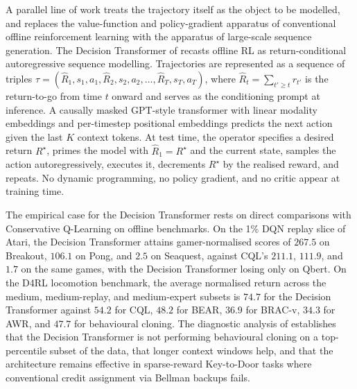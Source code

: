 A parallel line of work treats the trajectory itself as the object to be modelled,
and replaces the value-function and policy-gradient apparatus of conventional
offline reinforcement learning with the apparatus of large-scale sequence
generation. The Decision Transformer of \citet{Chen2021DT} recasts offline RL as
return-conditional autoregressive sequence modelling. Trajectories are represented
as a sequence of triples
$\tau = (\hat R_1, s_1, a_1, \hat R_2, s_2, a_2, \dots, \hat R_T, s_T, a_T)$, where
$\hat R_t = \sum_{t' \ge t} r_{t'}$ is the return-to-go from time $t$ onward and
serves as the conditioning prompt at inference. A causally masked GPT-style
transformer with linear modality embeddings and per-timestep positional
embeddings predicts the next action given the last $K$ context tokens. At test
time, the operator specifies a desired return $R^\star$, primes the model with
$\hat R_1 = R^\star$ and the current state, samples the action autoregressively,
executes it, decrements $R^\star$ by the realised reward, and repeats. No
dynamic programming, no policy gradient, and no critic appear at training time.

The empirical case for the Decision Transformer rests on direct comparisons with
Conservative Q-Learning \citep{Kumar2020} on offline benchmarks. On the 1\% DQN
replay slice of Atari, the Decision Transformer attains gamer-normalised scores of
$267.5$ on Breakout, $106.1$ on Pong, and $2.5$ on Seaquest, against CQL's
$211.1$, $111.9$, and $1.7$ on the same games, with the Decision Transformer
losing only on Qbert. On the D4RL locomotion benchmark, the average normalised
return across the medium, medium-replay, and medium-expert subsets is $74.7$ for
the Decision Transformer against $54.2$ for CQL, $48.2$ for BEAR, $36.9$ for
BRAC-v, $34.3$ for AWR, and $47.7$ for behavioural cloning. The diagnostic
analysis of \citet{Chen2021DT} establishes that the Decision Transformer is not
performing behavioural cloning on a top-percentile subset of the data, that
longer context windows help, and that the architecture remains effective in
sparse-reward Key-to-Door tasks where conventional credit assignment via Bellman
backups fails.

